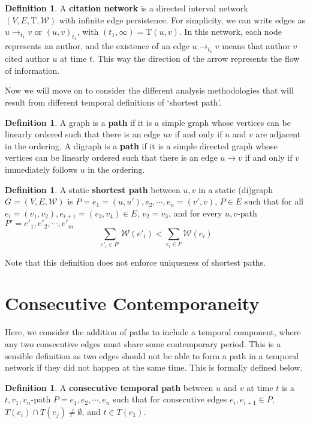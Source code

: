 \documentclass{article}
\theoremstyle{definition}
\newtheorem{defn}[thm]{Definition}
\numberwithin{thm}{subsection}
\newcommand{\W}{\mathcal{W}}
\newcommand{\T}{\text{T}}
\begin{document}
\begin{defn}
  A \textbf{citation network} is a directed interval network \\ $(V,E,\T,\W)$
  with infinite edge persistence. For simplicity, we can write edges as
  $u \to_{t_1} v$ or $(u,v)_{t_1}$, with $(t_1,\infty) = \T(u,v)$. In this
  network, each node represents an author, and the existence of an edge
  $u \to_{t_1} v$ means that author $v$ cited author $u$ at time $t$. This way
  the direction of the arrow represents the flow of information.
\end{defn}


Now we will move on to consider the different analysis methodologies that will
result from different temporal definitions of `shortest path'.

\begin{defn}
  A graph is a \textbf{path} if it is a simple graph whose vertices can be
  linearly ordered such that there is an edge $uv$ if and only if $u$ and $v$
  are adjacent in the ordering.
  A digraph is a \textbf{path} if it is a simple directed graph whose vertices
  can be linearly ordered such that there is an edge $u \to v$ if and only if
  $v$ immediately follows $u$ in the ordering.
\end{defn}

\begin{defn}
 A static \textbf{shortest path} between $u,v$ in a static (di)graph
 $G = (V,E,\W)$ is $P = e_1 = (u,u'), e_2, \cdots, e_n = (v',v)$,
 $P \in E$ such that for all $e_i = (v_1,v_2), e_{i+1} = (v_3,v_4) \in E$,
 $v_2 = v_3$, and for every $u,v$-path $P' = e'_1, e'_2, \cdots, e'_m$
  \[\sum_{e'_i \in P'} \W(e'_i) < \sum_{e_i \in P} \W(e_i) \]
 \end{defn}

Note that this definition does not enforce uniqueness of shortest paths.

\section{Consecutive Contemporaneity}

Here, we consider the addition of paths to include a temporal component, where
any two consecutive edges must share some contemporary period. This is a sensible
definition as two edges should not be able to form a path in a temporal network
if they did not happen at the same time. This is formally defined below.

\begin{defn}
  \label{defn:cons_temp_path}
  A \textbf{consecutive temporal path} between $u$ and $v$ at time $t$ is a $t,v_1,v_n$-path
  $P = e_1, e_2, \cdots, e_n$ such that for consecutive edges $e_i,e_{i+1} \in P$,
  $T(e_i) \cap T(e_j) \neq \emptyset$, and $t \in T(e_1)$.
\end{defn}
\end{document}
